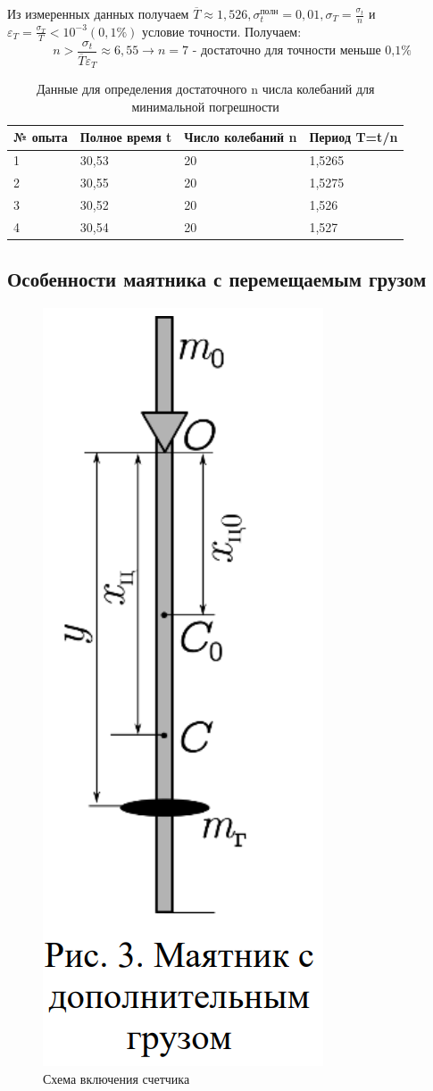 \documentclass[a4paper]{article}
\begin{document}
Из измеренных данных получаем $\overline{T} \approx 1,526, \sigma_{t}^{\text{полн}} = 0,01,  \sigma_{T} = \frac{\sigma_{t}}{n}$ и $\varepsilon_{T} = \frac{\sigma_{T}}{T} < 10^{-3} (0,1\%)$ условие точности. Получаем:
\[n > \frac{\sigma_{t}}{\overline{T} \varepsilon_{T}} \approx 6,55 \longrightarrow n = 7 \text{ - достаточно для точности меньше 0,1\%}\]



\begin{table}[!h]
\begin{center}
\begin{tabular}{|l|l|l|l|}
\hline
№ опыта & Полное время t & Число колебаний n & Период T=t/n \\ \hline
1       & 30,53          & 20                & 1,5265       \\ \hline
2       & 30,55          & 20                & 1,5275       \\ \hline
3       & 30,52          & 20                & 1,526        \\ \hline
4       & 30,54          & 20                & 1,527        \\ \hline
\end{tabular}
\caption{Данные для определения достаточного n числа колебаний для минимальной погрешности}
\end{center}
\end{table}

\subsection{Особенности маятника с перемещаемым грузом}

\begin{figure}
\centering
\includegraphics[width=.2\textwidth]{shema2.png}
\caption{Схема включения счетчика}
\end{figure}
\end{document}
